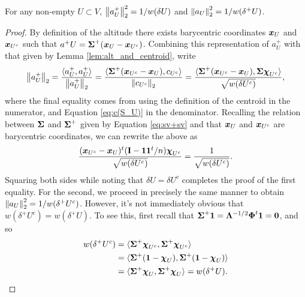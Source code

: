 \begin{lemma}
\label{lem:||alt||}
For any non-empty $U\subset V$, $\norm{a^+_U}_2^2=1/w(\delta U)$ and $\norm{a_U}_2^2 = 1/w(\delta^+ U)$.  
\end{lemma}
\begin{proof}
By definition of the altitude there exists barycentric coordinates $\vb*{x}_U$ and $\vb*{x}_{U^c}$ such that $a^+U = \boldsymbol{\Sigma}^+(\vb*{x}_U-\vb*{x}_{U^c})$. Combining this representation of $a^+_U$ with that given by Lemma \ref{lem:alt_and_centroid}, write 
\begin{align*}
    \norm{a^+_U}_2 = \frac{\langle a^+_U,a^+_U\rangle }{\norm{a^+_U}_2} = \frac{\langle \boldsymbol{\Sigma}^+(\vb*{x}_{U^c}-\vb*{x}_{U}), c_{U^c}\rangle }{\norm{c_{U^c}}_2} = \frac{\langle \boldsymbol{\Sigma}^+(\vb*{x}_{U^c}-\vb*{x}_{U}), \boldsymbol{\Sigma}\boldsymbol{\chi}_{U^c}\rangle }{\sqrt{w(\delta U^c)}},
\end{align*}
where the final equality comes from using the definition of the centroid in the numerator, and Equation \ref{eq:c(S_U)} in the denominator. Recalling the relation between $\boldsymbol{\Sigma}$ and $\boldsymbol{\Sigma}^+$ given by Equation \ref{eq:sv+sv} and that $\vb*{x}_U$ and $\vb*{x}_{U^c}$ are barycentric coordinates, we can rewrite the above as 
\[\frac{(\vb*{x}_{U^c}-\vb*{x}_{U})^t(\vb{I}-\vb{1}\vb{1}^t/n)\boldsymbol{\chi}_{U^c}}{\sqrt{w(\delta U^c)}}=\frac{1}{\sqrt{w(\delta U^c)}}. \]
Squaring both sides while noting that $\delta U = \delta U^c$ completes the proof of the first equality. For the second, we proceed in precisely the same manner to obtain $\norm{a_U}_2^2 = 1/w(\delta^+ U^c)$. However, it's not immediately obvious that $w(\delta^+U^c)=w(\delta^+U)$. To see this, first recall that $\boldsymbol{\Sigma}^+\vb{1} = \vb{\Lambda}^{-1/2}\boldsymbol{\Phi}^t\vb{1} = \vb{0}$, and so 
\begin{align*}
w(\delta^+ U^c) &= \langle \boldsymbol{\Sigma}^+\boldsymbol{\chi}_{U^c},\boldsymbol{\Sigma}^+\boldsymbol{\chi}_{U^c}\rangle  \\
&= \langle \boldsymbol{\Sigma}^+(\vb{1} - \boldsymbol{\chi}_{U}),\boldsymbol{\Sigma}^+(\vb{1} - \boldsymbol{\chi}_{U})\rangle  \\
&= \langle \boldsymbol{\Sigma}^+\boldsymbol{\chi}_{U},\boldsymbol{\Sigma}^+\boldsymbol{\chi}_{U}\rangle = w(\delta^+ U).
\qedhere
\end{align*}
\end{proof}


